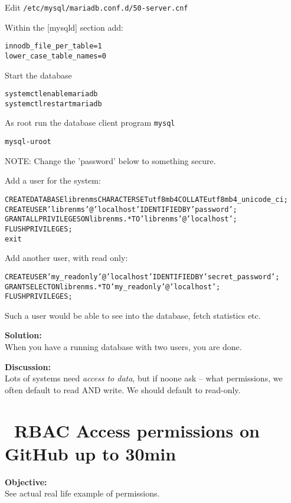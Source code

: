 \documentclass[a4paper,11pt,notitlepage]{report}
\begin{document}
Edit \verb+/etc/mysql/mariadb.conf.d/50-server.cnf+

Within the [mysqld] section add:

\begin{alltt}
innodb_file_per_table=1
lower_case_table_names=0
\end{alltt}

Start the database
\begin{alltt}
systemctl enable mariadb
systemctl restart mariadb
\end{alltt}

As root run the database client program \verb+mysql+
\begin{alltt}
mysql -u root
\end{alltt}

NOTE: Change the 'password' below to something secure.

Add a user for the system:
\begin{alltt}
CREATE DATABASE librenms CHARACTER SET utf8mb4 COLLATE utf8mb4_unicode_ci;
CREATE USER 'librenms'@'localhost' IDENTIFIED BY 'password';
GRANT ALL PRIVILEGES ON librenms.* TO 'librenms'@'localhost';
FLUSH PRIVILEGES;
exit
\end{alltt}

Add another user, with read only:
\begin{alltt}
CREATE USER 'my_readonly'@'localhost' IDENTIFIED BY 'secret_password';
GRANT SELECT ON librenms.* TO 'my_readonly'@'localhost';
FLUSH PRIVILEGES;
\end{alltt}

Such a user would be able to see into the database, fetch statistics etc.

{\bf Solution:}\\
When you have a running database with two users, you are done.


{\bf Discussion:}\\
Lots of systems need \emph{access to data}, but if noone ask -- what permissions, we often default to read AND write. We should default to read-only.



\chapter{\faExclamationTriangle\ RBAC Access permissions on GitHub up to 30min}
\label{ex:github-perms}

{\bf Objective:}\\
See actual real life example of permissions.
\end{document}
